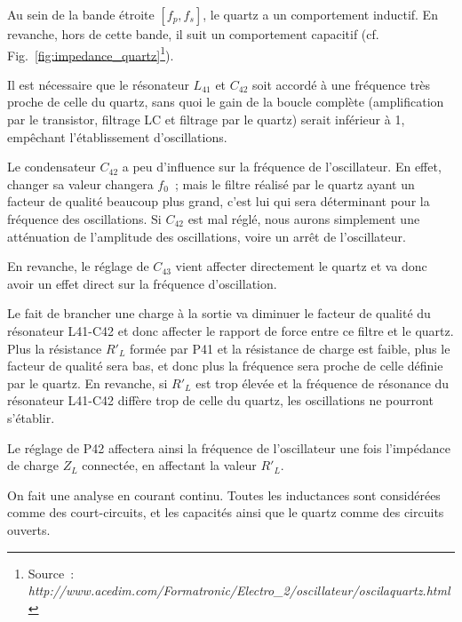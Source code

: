 \documentclass{article}
\begin{document}
Au sein de la bande étroite $[f_p,f_s]$, le quartz a un comportement inductif. En revanche, hors de cette bande, il suit un comportement capacitif (cf. Fig.~\ref{fig:impedance_quartz}\footnote{Source~: \textit{http://www.acedim.com/Formatronic/Electro\_2/oscillateur/oscilaquartz.html}}).

Il est nécessaire que le résonateur $L_{41}$ et $C_{42}$ soit accordé à une fréquence très proche de celle du quartz, sans quoi le gain de la boucle complète (amplification par le transistor, filtrage LC et filtrage par le quartz) serait inférieur à 1, empêchant l'établissement d'oscillations.


Le condensateur $C_{42}$ a peu d'influence sur la fréquence de l'oscillateur. En effet, changer sa valeur changera $f_0$~; mais le filtre réalisé par le quartz ayant un facteur de qualité beaucoup plus grand, c'est lui qui sera déterminant pour la fréquence des oscillations. Si $C_{42}$ est mal réglé, nous aurons simplement une atténuation de l'amplitude des oscillations, voire un arrêt de l'oscillateur.

En revanche, le réglage de $C_{43}$ vient affecter directement le quartz et va donc avoir un effet direct sur la fréquence d'oscillation.


Le fait de brancher une charge à la sortie va diminuer le facteur de qualité du résonateur L41-C42 et donc affecter le rapport de force entre ce filtre et le quartz. Plus la résistance $R'_L$ formée par P41 et la résistance de charge est faible, plus le facteur de qualité sera bas, et donc plus la fréquence sera proche de celle définie par le quartz. En revanche, si $R'_L$ est trop élevée et la fréquence de résonance du résonateur L41-C42 diffère trop de celle du quartz, les oscillations ne pourront s'établir.

Le réglage de P42 affectera ainsi la fréquence de l'oscillateur une fois l'impédance de charge $Z_L$ connectée, en affectant la valeur $R'_L$.


On fait une analyse en courant continu. Toutes les inductances sont considérées comme des court-circuits, et les capacités ainsi que le quartz comme des circuits ouverts.
\end{document}
